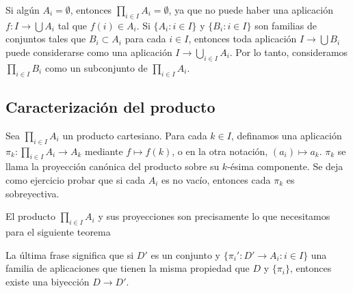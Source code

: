 Si algún \( A_i = \emptyset \), entonces \( \prod_{i \in I} A_i = \emptyset \), ya que no puede haber una aplicación \( f: I \to \bigcup A_i \) tal que \( f(i) \in A_i \). Si \( \{A_i : i \in I\} \) y \( \{B_i : i \in I\} \) son familias de conjuntos tales que \( B_i \subset A_i \) para cada \( i \in I \), entonces toda aplicación \( I \to \bigcup B_i \) puede considerarse como una aplicación \( I \to \bigcup_{i \in I} A_i \). Por lo tanto, consideramos \( \prod_{i \in I} B_i \) como un subconjunto de \( \prod_{i \in I} A_i \).

\subsection{Caracterización del producto}

Sea \( \prod_{i \in I} A_i \) un producto cartesiano. Para cada \( k \in I \), definamos una aplicación \( \pi_k: \prod_{i \in I} A_i \to A_k \) mediante \( f \mapsto f(k) \), o en la otra notación, \( (a_i) \mapsto a_k \). \( \pi_k \) se llama la {proyección canónica} del producto sobre su \( k \)-ésima componente. Se deja como ejercicio probar que si cada \( A_i \) es no vacío, entonces cada \( \pi_k \) es sobreyectiva.


El producto \( \prod_{i \in I} A_i \) y sus proyecciones son precisamente lo que necesitamos para el siguiente teorema

La última frase significa que si \( D' \) es un conjunto y \( \{\pi_i': D' \to A_i : i \in I\} \) una familia de aplicaciones que tienen la misma propiedad que \( D \) y \( \{\pi_i\} \), entonces existe una biyección \( D \to D' \).

